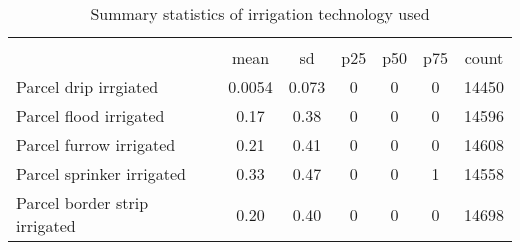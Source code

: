 \begin{table}[htbp]\centering
\def\sym#1{\ifmmode^{#1}\else\(^{#1}\)\fi}
\caption{Summary statistics of irrigation technology used}
\begin{tabular*}{1.0\hsize}{@{\hskip\tabcolsep\extracolsep\fill}l*{1}{cccccc}}
\toprule
                                    &\multicolumn{6}{c}{}                                                         \\
                                    &        mean&          sd&         p25&         p50&         p75&       count\\
\midrule
Parcel drip irrgiated               &      0.0054&       0.073&           0&           0&           0&       14450\\
Parcel flood irrigated              &        0.17&        0.38&           0&           0&           0&       14596\\
Parcel furrow irrigated             &        0.21&        0.41&           0&           0&           0&       14608\\
Parcel sprinker irrigated           &        0.33&        0.47&           0&           0&           1&       14558\\
Parcel border strip irrigated       &        0.20&        0.40&           0&           0&           0&       14698\\
\bottomrule
\end{tabular*}
\end{table}

